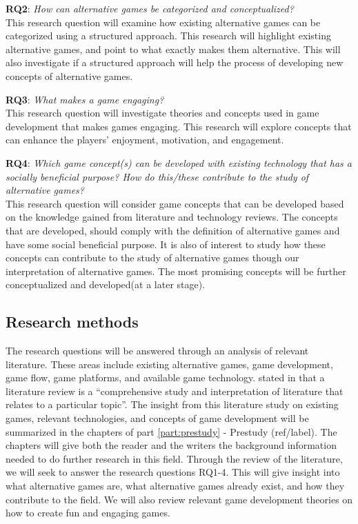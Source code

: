 \documentclass[../Main.tex]{subfiles}
\begin{document}
\textbf{RQ2}: \textit{How can alternative games be categorized and conceptualized?} \\
This research question will examine how existing alternative games can be categorized using a structured approach. This research will highlight existing alternative games, and point to what exactly makes them alternative. This will also investigate if a structured approach will help the process of developing new concepts of alternative games.

\textbf{RQ3}: \textit{What makes a game engaging?} \\
This research question will investigate theories and concepts used in game development that makes games engaging. This research will explore concepts that can enhance the players’ enjoyment, motivation, and engagement.

\textbf{RQ4}: \textit{ Which game concept(s) can be developed with existing technology that has a socially beneficial purpose? How do this/these contribute to the study of alternative games?} \\
This research question will consider game concepts that can be developed based on the knowledge gained from literature and technology reviews. The concepts that are developed, should comply with the definition of alternative games and  have some social beneficial purpose. It is also of interest to study how these concepts can contribute to  the study of alternative games though our interpretation of alternative games. The most promising concepts will be further conceptualized and developed(at a later stage). 



\subsection{Research methods}
The research questions will be answered through an analysis of relevant literature. These areas include existing alternative games, game development, game flow, game platforms, and available game technology. \citeauthor{aveyard_doing_2014}  stated in \citeyear{aveyard_doing_2014} that a literature review is a “comprehensive study and interpretation of literature that relates to a particular topic”. The insight from this literature study on existing games, relevant technologies, and concepts of game development will be summarized in the chapters of part \ref{part:prestudy} - Prestudy (ref/label). The chapters will give both the reader and the writers the background information needed to do further research in this field. Through the review of the literature, we will seek to answer the research questions RQ1-4. This will give insight into what alternative games are, what alternative games already exist, and how they contribute to the field. We will also review relevant game development theories on how to create fun and engaging games. 
\end{document}
